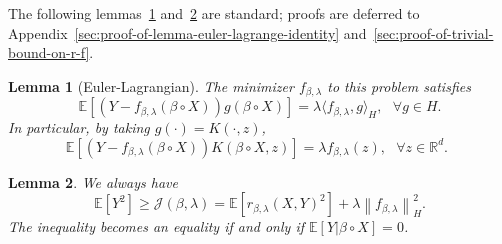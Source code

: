 \documentclass[sn-mathphys-num]{sn-jnl}%
\numberwithin{equation}{section}
\newcommand{\R}{\mathbb{R}}
\newcommand{\E}{\mathbb{E}}
\newcommand{\kernel}{K}
\newcommand{\norm}[1]{\left\|{#1}\right\|} %
\newtheorem{lemma}{Lemma}
\theoremstyle{thmstyleone}%
\theoremstyle{thmstyletwo}%
\theoremstyle{thmstylethree}%
\begin{document}

The following lemmas~\ref{lemma:euler-lagrange-identity} and~\ref{lemma:trivial-bound-on-r-f} are standard; 
proofs are deferred to Appendix~\ref{sec:proof-of-lemma-euler-lagrange-identity} and~\ref{sec:proof-of-trivial-bound-on-r-f}.





\vspace{.5em}
\begin{lemma}[Euler-Lagrangian]
\label{lemma:euler-lagrange-identity}
The minimizer $f_{\beta, \lambda}$ to this problem satisfies 
\begin{equation*}
	\E[(Y- f_{\beta, \lambda}(\beta \circ X)) g(\beta \circ X)] = \lambda \langle f_{\beta, \lambda}, g\rangle_H,~~~\forall g\in H.
\end{equation*}
In particular, by taking $g(\cdot) = \kernel(\cdot, z)$,
\begin{equation*}
	\E[(Y- f_{\beta, \lambda}(\beta \circ X)) \kernel(\beta \circ X, z)] = \lambda f_{\beta, \lambda}(z),~~~\forall z \in \R^d.~~
\end{equation*}
\end{lemma} 

\vspace{.5em}
\begin{lemma}
\label{lemma:trivial-bound-on-r-f}
We always have 
\begin{equation*}
	\E[Y^2] \ge \mathcal{J}(\beta, \lambda) = \E[r_{\beta, \lambda}(X, Y)^2] + \lambda \norm{f_{\beta, \lambda}}_H^2.
\end{equation*} 
The inequality becomes an equality if and only if $\E[Y|\beta \circ X] = 0$.
\end{lemma}




\end{document}
